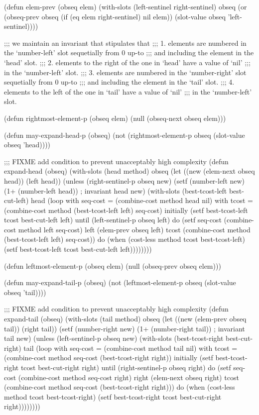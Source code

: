 (defun elem-prev (obseq elem)
  (with-slots (left-sentinel right-sentinel) obseq
    (or (obseq-prev obseq (if (eq elem right-sentinel) nil elem))
	(slot-value obseq 'left-sentinel))))

;;; we maintain an invariant that stipulates that 
;;; 1. elements are numbered in the `number-left' slot sequetially from 0 up-to
;;;    and including the element in the `head' slot. 
;;; 2. elements to the right of the one in `head' have a value of `nil'
;;;    in the `number-left' slot.
;;; 3. elements are numbered in the `number-right' slot sequetially from 0 up-to
;;;    and including the element in the `tail' slot. 
;;; 4. elements to the left of the one in `tail' have a value of `nil'
;;;    in the `number-left' slot.

(defun rightmost-element-p (obseq elem)
  (null (obseq-next obseq elem)))

(defun may-expand-head-p (obseq)
  (not (rightmost-element-p obseq (slot-value obseq 'head))))

;;; FIXME add condition to prevent unacceptably high complexity
(defun expand-head (obseq)
  (with-slots (head method) obseq
    (let ((new (elem-next obseq head))
	  (left head))
      (unless (right-sentinel-p obseq new)
	(setf (number-left new) (1+ (number-left head)) ; invariant
	      head new)
	(with-slots (best-tcost-left best-cut-left) head
	  (loop with seq-cost = (combine-cost method head nil)
		with tcost = (combine-cost method (best-tcost-left left) seq-cost)
		initially (setf best-tcost-left tcost
				best-cut-left left)
		until (left-sentinel-p obseq left)
		do (setf seq-cost (combine-cost method left seq-cost)
			 left (elem-prev obseq left)
			 tcost (combine-cost method (best-tcost-left left) seq-cost))
		do (when (cost-less method tcost best-tcost-left)
		     (setf best-tcost-left tcost
			   best-cut-left left))))))))

(defun leftmost-element-p (obseq elem)
  (null (obseq-prev obseq elem)))

(defun may-expand-tail-p (obseq)
  (not (leftmost-element-p obseq (slot-value obseq 'tail))))

;;; FIXME add condition to prevent unacceptably high complexity
(defun expand-tail (obseq)
  (with-slots (tail method) obseq
    (let ((new (elem-prev obseq tail))
	  (right tail))
      (setf (number-right new) (1+ (number-right tail)) ; invariant
	    tail new)
      (unless (left-sentinel-p obseq new)
	(with-slots (best-tcost-right best-cut-right) tail
	  (loop with seq-cost = (combine-cost method tail nil)
		with tcost = (combine-cost method seq-cost (best-tcost-right right))
		initially (setf best-tcost-right tcost
				best-cut-right right)
		until (right-sentinel-p obseq right)
		do (setf seq-cost (combine-cost method seq-cost right)
			 right (elem-next obseq right)
			 tcost (combine-cost method seq-cost (best-tcost-right right)))
		do (when (cost-less method tcost best-tcost-right)
		     (setf best-tcost-right tcost
			   best-cut-right right))))))))

